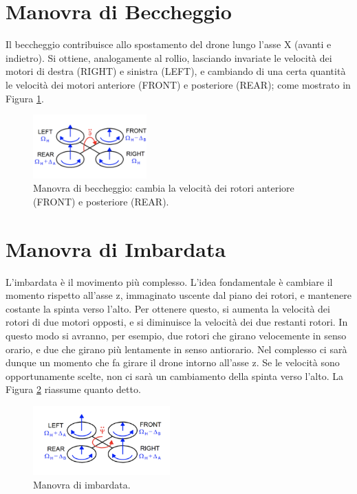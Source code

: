 \section*{Manovra di Beccheggio}
Il beccheggio contribuisce allo spostamento del drone lungo l'asse X (avanti e indietro). Si ottiene, analogamente al rollio, lasciando invariate le velocità dei motori di destra (RIGHT) e sinistra (LEFT), e cambiando di una certa quantità le velocità dei motori anteriore (FRONT) e posteriore (REAR); come mostrato in Figura \ref{fig:pitch_quad}.

\begin{figure}[H]
    \centering
    \includegraphics[width=0.39\textwidth]{gfx/pitch_quad}
    \caption[Manovra di beccheggio di un quadrirotore.]{Manovra di beccheggio: cambia la velocità dei rotori anteriore (FRONT) e posteriore (REAR).}
    \label{fig:pitch_quad}
\end{figure}

\section*{Manovra di Imbardata}
L'imbardata è il movimento più complesso. L’idea fondamentale è cambiare il momento rispetto all’asse z, immaginato uscente dal piano dei rotori, e mantenere costante la spinta verso l’alto. Per ottenere questo, si aumenta la velocità dei rotori di due motori opposti, e si diminuisce la velocità dei due restanti rotori. In questo modo si avranno, per esempio, due rotori che girano velocemente in senso orario, e due che girano più lentamente in senso antiorario. Nel complesso ci sarà dunque un momento che fa girare il drone intorno all’asse z. Se le velocità sono opportunamente scelte, non ci sarà un cambiamento della spinta verso l’alto. La Figura \ref{fig:yaw_quad} riassume quanto detto.

\begin{figure}[H]
    \centering
    \includegraphics[width=0.47\textwidth]{gfx/yaw_quad}
    \caption[Manovra di imbardata di un quadrirotorre.]{Manovra di imbardata.}
    \label{fig:yaw_quad}
\end{figure}

